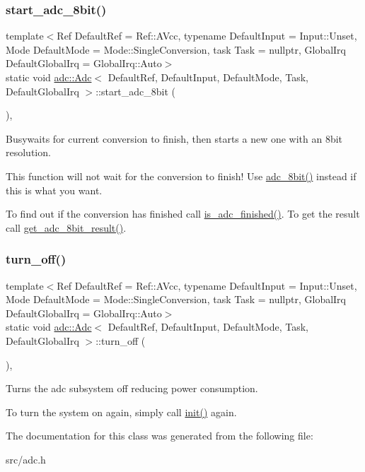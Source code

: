 \subsubsection{\texorpdfstring{start\+\_\+adc\+\_\+8bit()}{start\_adc\_8bit()}}
{\footnotesize\ttfamily template$<$Ref Default\+Ref = Ref\+::\+A\+Vcc, typename Default\+Input  = Input\+::\+Unset, Mode Default\+Mode = Mode\+::\+Single\+Conversion, task Task = nullptr, Global\+Irq Default\+Global\+Irq = Global\+Irq\+::\+Auto$>$ \\
static void \hyperlink{classadc_1_1Adc}{adc\+::\+Adc}$<$ Default\+Ref, Default\+Input, Default\+Mode, Task, Default\+Global\+Irq $>$\+::start\+\_\+adc\+\_\+8bit (\begin{DoxyParamCaption}{ }\end{DoxyParamCaption})\hspace{0.3cm}{\ttfamily [inline]}, {\ttfamily [static]}}



Busywaits for current conversion to finish, then starts a new one with an 8bit resolution. 

This function will not wait for the conversion to finish! Use \hyperlink{classadc_1_1Adc_ae289bfed72b4cfab79dae680cc4d9ab4}{adc\+\_\+8bit()} instead if this is what you want.

To find out if the conversion has finished call \hyperlink{classadc_1_1Adc_a76738f38cfbc9380c244867c754e1e62}{is\+\_\+adc\+\_\+finished()}. To get the result call \hyperlink{classadc_1_1Adc_a780877e68b2f2d61596e594db04179ed}{get\+\_\+adc\+\_\+8bit\+\_\+result()}. \hypertarget{classadc_1_1Adc_a0c1266c2f27fefea08595aaf26762f26}{}\label{classadc_1_1Adc_a0c1266c2f27fefea08595aaf26762f26} 
\subsubsection{\texorpdfstring{turn\+\_\+off()}{turn\_off()}}
{\footnotesize\ttfamily template$<$Ref Default\+Ref = Ref\+::\+A\+Vcc, typename Default\+Input  = Input\+::\+Unset, Mode Default\+Mode = Mode\+::\+Single\+Conversion, task Task = nullptr, Global\+Irq Default\+Global\+Irq = Global\+Irq\+::\+Auto$>$ \\
static void \hyperlink{classadc_1_1Adc}{adc\+::\+Adc}$<$ Default\+Ref, Default\+Input, Default\+Mode, Task, Default\+Global\+Irq $>$\+::turn\+\_\+off (\begin{DoxyParamCaption}{ }\end{DoxyParamCaption})\hspace{0.3cm}{\ttfamily [inline]}, {\ttfamily [static]}}



Turns the adc subsystem off reducing power consumption. 

To turn the system on again, simply call \hyperlink{classadc_1_1Adc_a146fe898e16915e9b344019c59cdcfa3}{init()} again. 

The documentation for this class was generated from the following file\+:\begin{DoxyCompactItemize}
\item 
src/adc.\+h\end{DoxyCompactItemize}
